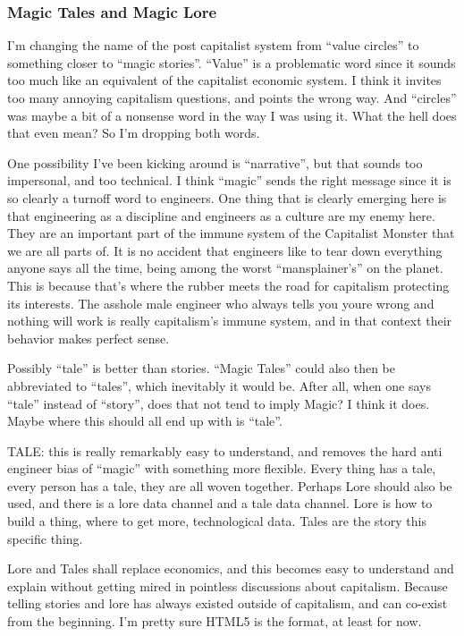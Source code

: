 \subsubsection{Magic Tales and Magic
Lore}\label{magic-tales-and-magic-lore}

I'm changing the name of the post capitalist system from ``value
circles'' to something closer to ``magic stories''. ``Value'' is a
problematic word since it sounds too much like an equivalent of the
capitalist economic system. I think it invites too many annoying
capitalism questions, and points the wrong way. And ``circles'' was
maybe a bit of a nonsense word in the way I was using it. What the hell
does that even mean? So I'm dropping both words.

One possibility I've been kicking around is ``narrative'', but that
sounds too impersonal, and too technical. I think ``magic'' sends the
right message since it is so clearly a turnoff word to engineers. One
thing that is clearly emerging here is that engineering as a discipline
and engineers as a culture are my enemy here. They are an important part
of the immune system of the Capitalist Monster that we are all parts of.
It is no accident that engineers like to tear down everything anyone
says all the time, being among the worst ``mansplainer's'' on the
planet. This is because that's where the rubber meets the road for
capitalism protecting its interests. The asshole male engineer who
always tells you youre wrong and nothing will work is really
capitalism's immune system, and in that context their behavior makes
perfect sense.

Possibly ``tale'' is better than stories. ``Magic Tales'' could also
then be abbreviated to ``tales'', which inevitably it would be. After
all, when one says ``tale'' instead of ``story'', does that not tend to
imply Magic? I think it does. Maybe where this should all end up with is
``tale''.

TALE: this is really remarkably easy to understand, and removes the hard
anti engineer bias of ``magic'' with something more flexible. Every
thing has a tale, every person has a tale, they are all woven together.
Perhaps Lore should also be used, and there is a lore data channel and a
tale data channel. Lore is how to build a thing, where to get more,
technological data. Tales are the story this specific thing.

Lore and Tales shall replace economics, and this becomes easy to
understand and explain without getting mired in pointless discussions
about capitalism. Because telling stories and lore has always existed
outside of capitalism, and can co-exist from the beginning. I'm pretty
sure HTML5 is the format, at least for now.

